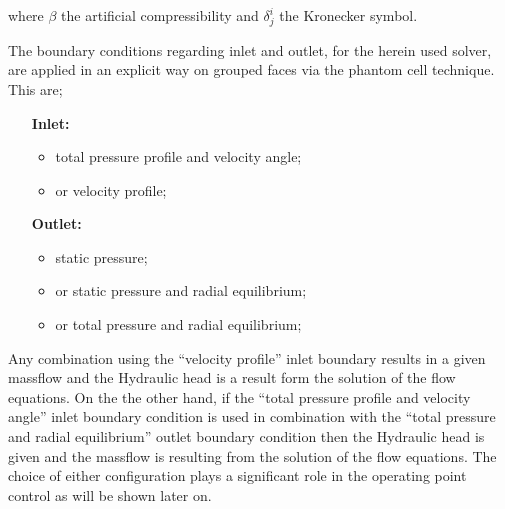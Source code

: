 where $\beta$ the artificial compressibility \cite{Chorin,Turkel87} and $\delta^i_j$ the Kronecker symbol.

The boundary conditions regarding inlet and outlet, for the herein used solver, are applied in an explicit way on grouped faces via the phantom cell technique. This are;
\begin{itemize}
\item[\textbf{Inlet: }]
	\begin{itemize}
	\item total pressure profile and velocity angle;
	\item or velocity profile;
	\end{itemize}
\item[\textbf{Outlet: }]
	\begin{itemize}
	\item static pressure;
	\item or static pressure and radial equilibrium;
	\item or total pressure and radial equilibrium;
	\end{itemize}
\end{itemize}

Any combination using the ``velocity profile'' inlet boundary results in a given massflow and the Hydraulic head  is a result form the solution of the flow equations. On the the other hand, if the ``total pressure profile and velocity angle'' inlet boundary condition is used in combination with the ``total pressure and radial equilibrium'' outlet  boundary condition then the Hydraulic head is given and the massflow is resulting from the solution of the flow equations. The choice of either configuration plays a significant role in the operating point control as will be shown later on.        

 
